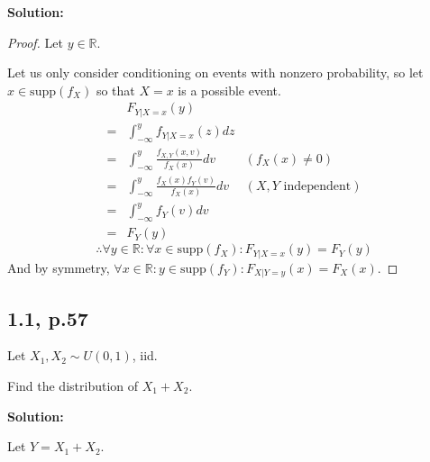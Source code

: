 \documentclass{article}
\begin{document}
\textbf{Solution:}

\begin{proof}
Let \(y\in \mathbb{R}\).

Let us only consider conditioning on events with nonzero probability, so let \(x\in \text{supp}(f_X)\) so that \(X=x\) is a possible event.
\begin{align*}
     & F_{Y|X=x}(y) \\
    =& \int_{-\infty}^yf_{Y|X=x}(z)dz \\
    =& \int_{-\infty}^y\frac{f_{X,Y}(x,v)}{f_X(x)}dv & (f_X(x) \neq 0) \\
    =& \int_{-\infty}^y\frac{f_X(x)f_Y(v)}{f_X(x)}dv & (X,Y\text{ independent}) \\
    =& \int_{-\infty}^yf_Y(v)dv \\
    =& F_Y(y)
\end{align*}
\[\therefore \forall y\in \mathbb{R}:\forall x\in \text{supp}(f_X): F_{Y|X=x}(y)=F_Y(y)\]
And by symmetry, \(\forall x\in\mathbb{R}:y\in \text{supp}(f_Y):F_{X|Y=y}(x)=F_X(x)\).
\end{proof}

\subsection{1.1, p.57}

Let \(X_1,X_2 \sim U(0,1)\), iid.

Find the distribution of \(X_1+X_2\).

\textbf{Solution:}

Let \(Y=X_1+X_2\).
\end{document}
